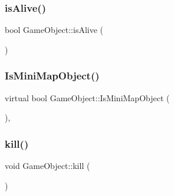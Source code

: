 \hypertarget{class_game_object_a2494b14b0e42549791b67d271503a0bc}{}\label{class_game_object_a2494b14b0e42549791b67d271503a0bc} 
\subsubsection{\texorpdfstring{is\+Alive()}{isAlive()}}
{\footnotesize\ttfamily bool Game\+Object\+::is\+Alive (\begin{DoxyParamCaption}{ }\end{DoxyParamCaption})\hspace{0.3cm}{\ttfamily [inline]}}

\hypertarget{class_game_object_a86859eb19fa3f64529c83542ffa565e6}{}\label{class_game_object_a86859eb19fa3f64529c83542ffa565e6} 
\subsubsection{\texorpdfstring{Is\+Mini\+Map\+Object()}{IsMiniMapObject()}}
{\footnotesize\ttfamily virtual bool Game\+Object\+::\+Is\+Mini\+Map\+Object (\begin{DoxyParamCaption}{ }\end{DoxyParamCaption})\hspace{0.3cm}{\ttfamily [inline]}, {\ttfamily [virtual]}}

\hypertarget{class_game_object_af54107b086de78b1fc6190088bdfb468}{}\label{class_game_object_af54107b086de78b1fc6190088bdfb468} 
\subsubsection{\texorpdfstring{kill()}{kill()}}
{\footnotesize\ttfamily void Game\+Object\+::kill (\begin{DoxyParamCaption}{ }\end{DoxyParamCaption})\hspace{0.3cm}{\ttfamily [inline]}}

\hypertarget{class_game_object_adf9c98e9a2d3637bf57065d5a407e697}{}\label{class_game_object_adf9c98e9a2d3637bf57065d5a407e697} 
